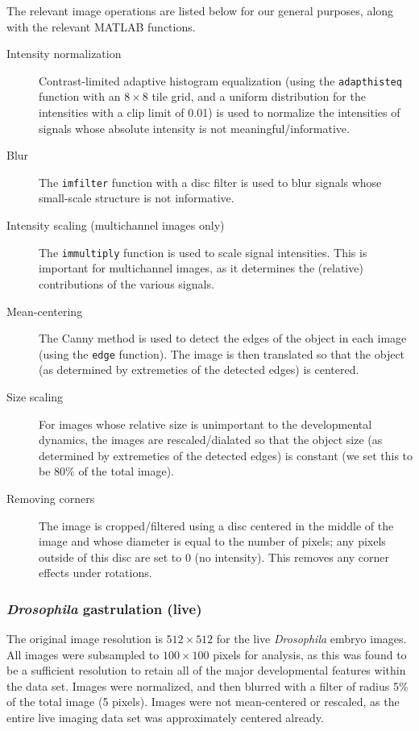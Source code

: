 The relevant image operations are listed below for our general purposes, along with the relevant MATLAB functions. 
\begin{description}

\item[Intensity normalization] Contrast-limited adaptive histogram equalization (using the \texttt{adapthisteq} function with an $8 \times 8$ tile grid, and a uniform distribution for the intensities with a clip limit of 0.01) is used to normalize the intensities of signals whose absolute intensity is not meaningful/informative.
%
\item[Blur] The \texttt{imfilter} function with a disc filter is used to blur signals whose small-scale structure is not informative. 
%
\item[Intensity scaling (multichannel images only)] The \texttt{immultiply} function is used to scale signal intensities. This is important for multichannel images, as it determines the (relative) contributions of the various signals.  
%
\item[Mean-centering]  The Canny method \citep{canny1986computational} is used to detect the edges of the object in each image (using the \texttt{edge} function). The image is then translated so that the object (as determined by extremeties of the detected edges) is centered.
%
\item[Size scaling] For images whose relative size is unimportant to the developmental dynamics, the images are rescaled/dialated so that the object size (as determined by extremeties of the detected edges) is constant (we set this to be 80\% of the total image).
%
\item[Removing corners] The image is cropped/filtered using a disc centered in the middle of the image and whose diameter is equal to the number of pixels; any pixels outside of this disc are set to 0 (no intensity). This removes any corner effects under rotations. 
\end{description}



\subsubsection{{\em Drosophila} gastrulation (live)}

%
The original image resolution is $512 \times 512$ for the live {\em Drosophila} embryo images.
%
All images were subsampled to $100 \times 100$ pixels for analysis, as this was found to be a sufficient resolution to retain all of the major developmental features within the data set. 
%
Images were normalized, and then blurred with a filter of radius 5\% of the total image (5 pixels). 
%
Images were not mean-centered or rescaled, as the entire live imaging data set was approximately centered already.


